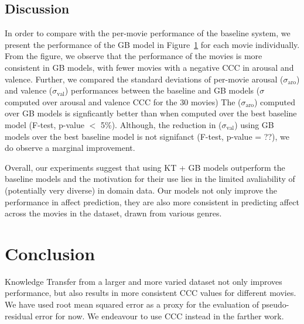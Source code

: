 \documentclass{article}
\begin{document}
\subsection{Discussion}

In order to compare with the per-movie performance of the baseline system, we present the performance of the GB model in Figure~\ref{} for each movie individually.
From the figure, we observe that the performance of the movies is more consistent in GB models, with fewer movies with a negative CCC in arousal and valence.
Further, we compared the standard deviations of per-movie arousal ($\sigma_\text{aro}$) and valence ($\sigma_\text{val}$) performances between the baseline and GB models ($\sigma$ computed over arousal and valence CCC for the 30 movies) 
The ($\sigma_\text{aro}$) computed over GB models is signficantly better than when computed over the best baseline model (F-test, p-value $<$ 5\%). 
Although, the reduction in ($\sigma_\text{val}$) using GB models over the best baseline model is not signifanct (F-test, p-value = ??), we do observe a marginal improvement. 

Overall, our experiments suggest that using KT + GB models outperform the baseline models and the motivation for their use lies in the limited avaliability of (potentially very diverse) in domain data.
Our models not only improve the performance in affect prediction, they are also more consistent in predicting affect across the movies in the dataset, drawn from various genres.

\section{Conclusion}
Knowledge Transfer from a larger and more varied dataset not only improves performance, but also results in more consistent CCC values for different movies. We have used root mean squared error as a proxy for the evaluation of pseudo-residual error for now. We endeavour to use CCC instead in the farther work. 

\footnotesize{
\begin{spacing}{.85 }


\end{spacing}
}
\end{document}

